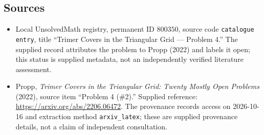 \documentclass[11pt]{article}
\begin{document}
\subsection{Sources}
\begin{itemize}
\item Local UnsolvedMath registry, permanent ID \(800350\), source code \texttt{catalogue entry}, title ``Trimer Covers in the Triangular Grid --- Problem 4.'' The supplied record attributes the problem to Propp (2022) and labels it open; this status is supplied metadata, not an independently verified literature assessment.
\item Propp, \emph{Trimer Covers in the Triangular Grid: Twenty Mostly Open Problems} (2022), source item ``Problem 4 (\#2).'' Supplied reference: \url{https://arxiv.org/abs/2206.06472}. The provenance records access on 2026-10-16 and extraction method \texttt{arxiv\_latex}; these are supplied provenance details, not a claim of independent consultation.
\end{itemize}
\end{document}
